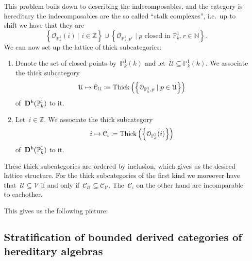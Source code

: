 \documentclass[10pt,a4paper]{article}
\begin{document}
This problem boils down to describing the indecomposables, and the category is hereditary the indecomposables are the so called ``stalk complexes'', i.e.\ up to shift we have that they are
\begin{equation}
  \left\{ \mathcal{O}_{\mathbb{P}_k^1}(i)\mid i\in\mathbb{Z} \right\}\cup\left\{ \mathcal{O}_{\mathbb{P}_k^1,p^r}\mid\text{$p$ closed in $\mathbb{P}_k^1$}, r\in\mathbb{N} \right\}.
\end{equation}
We can now set up the lattice of thick subcategories:
\begin{enumerate}
  \item Denote the set of closed points by~$\mathbb{P}_k^1(k)$ and let~$\mathcal{U}\subseteq\mathbb{P}_k^1(k)$. We associate the thick subcategory
    \begin{equation}
      \mathcal{U}\mapsto\mathcal{C}_{\mathcal{U}}\coloneqq\operatorname{Thick}\left( \left\{ \mathcal{O}_{\mathbb{P}_k^1,p}\mid p\in\mathcal{U} \right\} \right)
    \end{equation}
    of~$\mathbf{D}^{\mathrm{b}}(\mathbb{P}_k^1)$ to it.
  \item Let~$i\in\mathbb{Z}$. We associate the thick subcategory
    \begin{equation}
      i\mapsto\mathcal{C}_i\coloneqq\operatorname{Thick}\left( \left\{ \mathcal{O}_{\mathbb{P}_k^1}(i) \right\} \right)
    \end{equation}
    of~$\mathbf{D}^{\mathrm{b}}(\mathbb{P}_k^1)$ to it.
\end{enumerate}
These thick subcategories are ordered by inclusion, which gives us the desired lattice structure. For the thick subcategories of the first kind we moreover have that~$\mathcal{U}\subseteq\mathcal{V}$ if and only if~$\mathcal{C}_{\mathcal{U}}\subseteq\mathcal{C}_{\mathcal{V}}$. The~$\mathcal{C}_i$ on the other hand are incomparable to eachother.

This gives us the following picture:

\subsection{Stratification of bounded derived categories of hereditary algebras}
\end{document}
